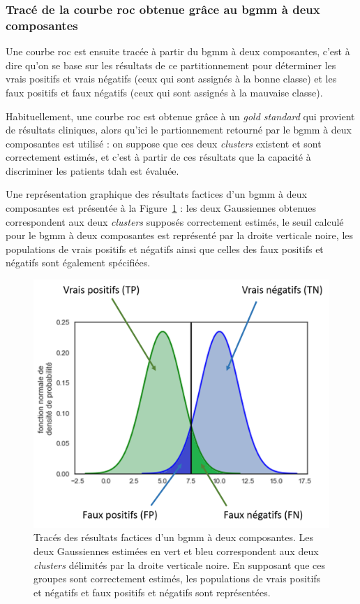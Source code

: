 \subsubsection{Tracé de la courbe \gls{roc} obtenue grâce au \gls{bgmm} à deux composantes}
Une courbe \gls{roc} est ensuite tracée à partir du \gls{bgmm} à deux composantes, c'est à dire qu'on se base sur les résultats de ce partitionnement pour déterminer les 
vrais positifs et vrais négatifs (ceux qui sont assignés à la bonne classe) et les faux positifs et faux négatifs (ceux qui sont assignés à la mauvaise classe). 

Habituellement, une courbe \gls{roc}
est obtenue grâce à un \textit{gold standard} qui provient de résultats cliniques, alors qu'ici le partionnement retourné par le \gls{bgmm} à deux composantes est utilisé : on suppose 
que ces deux \textit{clusters} existent et sont correctement estimés, et c'est à partir de ces résultats que la capacité à discriminer les patients \gls{tdah} est évaluée.

Une représentation graphique des résultats factices d'un \gls{bgmm} à deux composantes est présentée à la Figure~\ref{Figure:tbr_bgmm_example} : les deux Gaussiennes obtenues correspondent 
aux deux \textit{clusters} supposés correctement estimés,
le seuil calculé pour le \gls{bgmm} à deux composantes est représenté par la droite verticale noire, les populations de vrais positifs et négatifs ainsi que celles des faux positifs 
et négatifs sont également spécifiées. 

\begin{figure}[h!]
  \centering
	\includegraphics[width=0.7\linewidth]{figures/chapter-4/tbr-bgmm-example} 
  \caption{Tracés des résultats factices d'un \gls{bgmm} à deux composantes. Les deux Gaussiennes estimées en vert et bleu correspondent aux deux \textit{clusters} délimités par la droite
	verticale noire. En supposant que ces groupes sont correctement estimés, les populations de vrais positifs et négatifs et faux positifs et négatifs sont représentées.} 
	\label{Figure:tbr_bgmm_example} 
\end{figure}

